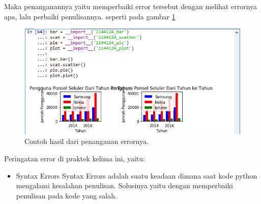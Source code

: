 \hfill \break
Maka penanganannya yaitu memperbaiki error tersebut dengan melihat errornya apa, lalu perbaiki penulisannya. seperti pada gambar \ref{error1}
\begin{figure}[H]
	\includegraphics[width=12cm]{figures/6/1144124/error1.png}
	\centering
	\caption{Contoh hasil dari penanganan errornya.}
    \label{error1}
\end{figure}

\hfill \break
Peringatan error di praktek kelima ini, yaitu:
\begin{itemize}
	\item Syntax Errors
	Syntax Errors adalah suatu keadaan dimana saat kode python mengalami kesalahan penulisan. Solusinya yaitu dengan memperbaiki penulisan pada kode yang salah.
\end{itemize}

